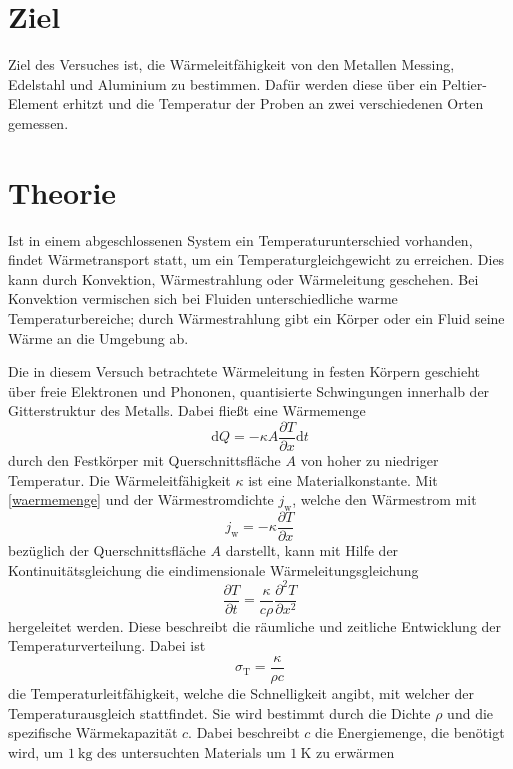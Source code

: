 \section{Ziel}
\label{sec:ziel}

Ziel des Versuches ist, die Wärmeleitfähigkeit von den Metallen Messing, Edelstahl und Aluminium zu bestimmen. Dafür werden diese über ein Peltier-Element erhitzt und die Temperatur der Proben an zwei verschiedenen Orten gemessen.

\section{Theorie}
\label{sec:theorie}

Ist in einem abgeschlossenen System ein Temperaturunterschied vorhanden, findet Wärmetransport statt, um ein Temperaturgleichgewicht zu erreichen. Dies kann durch Konvektion, Wärmestrahlung oder Wärmeleitung geschehen. 
Bei Konvektion vermischen sich bei Fluiden unterschiedliche warme Temperaturbereiche; 
durch Wärmestrahlung gibt ein Körper oder ein Fluid seine Wärme an die Umgebung ab.

Die in diesem Versuch betrachtete Wärmeleitung in festen Körpern geschieht über freie Elektronen und Phononen, quantisierte Schwingungen innerhalb der Gitterstruktur des Metalls.
Dabei fließt eine Wärmemenge
\begin{equation}
	\label{waermemenge}
	\mathup{d}Q=-\kappa A\frac{\partial{T}}{\partial{x}}\mathup{d}t
\end{equation}
durch den Festkörper mit Querschnittsfläche $A$ von hoher zu niedriger Temperatur.
Die Wärmeleitfähigkeit $\kappa$ ist eine Materialkonstante.
Mit \eqref{waermemenge} und der Wärmestromdichte $j_\mathup{w}$, welche den Wärmestrom mit 
\begin{equation}
	\label{waermestromdichte}
	j_\mathup{w}= -\kappa \frac{\partial{T}}{\partial{x}}
\end{equation}
bezüglich der Querschnittsfläche $A$ darstellt,
kann mit Hilfe der Kontinuitätsgleichung die eindimensionale Wärmeleitungsgleichung
\begin{equation}
	\label{waermeleitungsgleichung}
	\frac{\partial{T}}{\partial{t}} =  \frac{\kappa}{c\rho}\frac{\partial^2{T}}{\partial{x^2}}
\end{equation}
hergeleitet werden.
Diese beschreibt die räumliche und zeitliche Entwicklung der Temperaturverteilung. 
Dabei ist
\begin{equation}
	\label{temperaturleitfaehigkeit}
	\sigma_\mathup{T}=\frac{\kappa}{{\rho}c}
\end{equation}
die Temperaturleitfähigkeit, welche die Schnelligkeit angibt, mit welcher der Temperaturausgleich stattfindet.
Sie wird bestimmt durch die Dichte $\rho$ und die spezifische Wärmekapazität $c$. 
Dabei beschreibt $c$ die Energiemenge, die benötigt wird, um $\SI{1}{\kilo\gram}$ des untersuchten Materials um $\SI{1}{\kelvin}$ zu erwärmen

